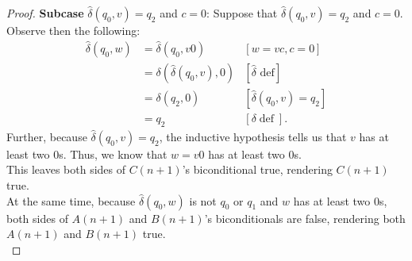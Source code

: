 \documentclass[10pt]{article}
\begin{document}
\begin{enumerate}[label={}]
\begin{proof}
              \textbf{Subcase }$\hat{\delta}\left(q_0, v\right)=q_2$ and $c=0$: Suppose that $\hat{\delta}\left(q_0, v\right)=q_2$ and $c=0$. Observe then the following:
              $$
                  \begin{aligned}
                      \hat{\delta}\left(q_0, w\right) & =\hat{\delta}\left(q_0, v 0\right)                    & {[w=v c, c=0] }                                     \\
                                                      & =\delta\left(\hat{\delta}\left(q_0, v\right),0\right) & {[\hat{\delta} \text { def}] }                      \\
                                                      & =\delta\left(q_2, 0\right)                            & {\left[\hat{\delta}\left(q_0, v\right)=q_2\right] } \\
                                                      & =q_2                                                  & {[\delta \operatorname{def}] . }
                  \end{aligned}
              $$
              Further, because $\hat{\delta}\left(q_0, v\right)=q_2$, the inductive hypothesis tells us that $v$ has at least two 0s. Thus, we know that $w=v0$ has at least two 0s.\\
              This leaves both sides of $C(n+1)$'s biconditional true, rendering $C(n+1)$ true.\\
              At the same time, because $\hat{\delta}\left(q_0, w\right)$ is not $q_0$ or $q_1$ and $w$ has at least two 0s, both sides of $A(n+1)$ and $B(n+1)$'s biconditionals are false, rendering both $A(n+1)$ and $B(n+1)$ true.\\


\end{proof}
\end{enumerate}
\end{document}
